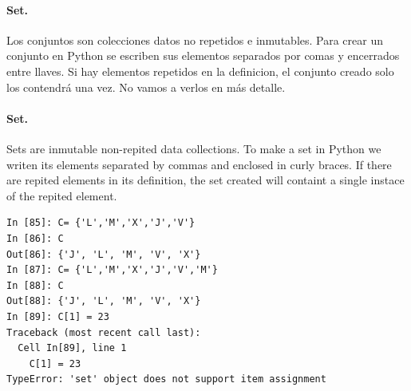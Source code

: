 \begin{paracol}{2}
\paragraph{Set.} Los conjuntos son colecciones datos no repetidos e inmutables. Para crear un conjunto en Python se escriben sus elementos separados por comas y encerrados entre llaves. Si hay elementos repetidos en la definicion, el conjunto creado solo los contendrá una vez. No vamos a verlos en más detalle.
\switchcolumn
\paragraph{Set.} Sets are inmutable non-repited data collections. To make a set in Python we writen its elements separated by commas and enclosed in curly braces. If there are repited elements in its definition, the set created will containt a single instace of the repited element.
\end{paracol}

\begin{center}
\begin{minipage}{0.4\textwidth}
\begin{verbatim}
In [85]: C= {'L','M','X','J','V'}
In [86]: C
Out[86]: {'J', 'L', 'M', 'V', 'X'}
In [87]: C= {'L','M','X','J','V','M'}
In [88]: C
Out[88]: {'J', 'L', 'M', 'V', 'X'}
In [89]: C[1] = 23
Traceback (most recent call last):
  Cell In[89], line 1
    C[1] = 23
TypeError: 'set' object does not support item assignment
\end{verbatim}
\end{minipage}
\end{center}

